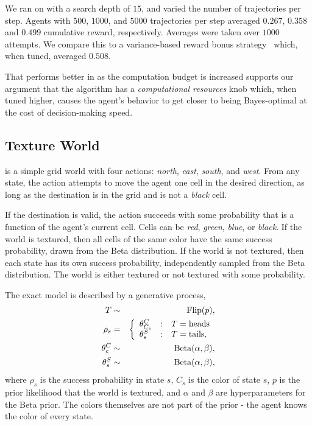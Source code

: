 We ran  on  with a search depth of $15$, and varied the number of trajectories per step. Agents with $500$, $1000$, and $5000$ trajectories per step averaged $0.267$, $0.358$ and $0.499$ cumulative reward, respectively. Averages were taken over $1000$ attempts. We compare this to a variance-based reward bonus strategy~\cite{sorg10} which, when tuned, averaged $0.508$.

That  performs better in  as the computation budget is increased supports our argument that the algorithm has a \emph{computational resources} knob which, when tuned higher, causes the agent's behavior to get closer to being Bayes-optimal at the cost of decision-making speed.

\subsection{Texture World}

 is a simple grid world with four actions: \emph{north}, \emph{east}, \emph{south}, and \emph{west}. From any state, the action attempts to move the agent one cell in the desired direction, as long as the destination is in the grid and is not a \emph{black} cell.

If the destination is valid, the action succeeds with some probability that is a function of the agent's current cell. Cells can be \emph{red}, \emph{green}, \emph{blue}, or \emph{black}. If the world is textured, then all cells of the same color have the same success probability, drawn from the Beta distribution. If the world is not textured, then each state has its own success probability, independently sampled from the Beta distribution. The world is either textured or not textured with some probability.

The exact model is described by a generative process,
\begin{eqnarray}
T &\sim& \mbox{Flip}(p),\\
\rho_s &=&
\left\{\begin{array}{lll}
 \theta^C_{C_s}&:&T = \mbox{heads} \\
 \theta^S_s&:&T = \mbox{tails} ,
\end{array}\right.\\
\theta^C_c &\sim& \mbox{Beta}(\alpha,\beta),\\
\theta^S_s &\sim& \mbox{Beta}(\alpha,\beta),
\end{eqnarray}
where $\rho_s$ is the success probability in state $s$, $C_s$ is the color of state $s$, $p$ is the prior likelihood that the world is textured, and $\alpha$ and $\beta$ are hyperparameters for the Beta prior. The colors themselves are not part of the prior - the agent knows the color of every state.

